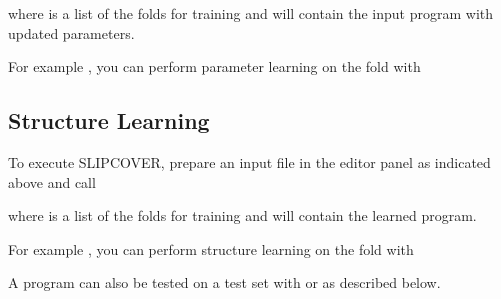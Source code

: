 \documentclass[letterpaper,10pt,english]{sphinxmanual}
\begin{document}
\sphinxAtStartPar
where  is a list of the folds for training and  will contain the input program with updated parameters.

\sphinxAtStartPar
For example , you can perform parameter learning on the  fold with

\begin{sphinxVerbatim}[commandchars=\\\{\}]
 \PYG{p}{[}\PYG{p}{]}
\end{sphinxVerbatim}


\subsection{Structure Learning}
\label{\detokenize{index:structure-learning}}
\sphinxAtStartPar
To execute SLIPCOVER, prepare an input file in the editor panel as indicated above and call

\begin{sphinxVerbatim}[commandchars=\\\{\}]
  
\end{sphinxVerbatim}

\sphinxAtStartPar
where  is a list of the folds for training and  will contain the learned program.

\sphinxAtStartPar
For example , you can perform structure learning on the  fold with

\begin{sphinxVerbatim}[commandchars=\\\{\}]
 \PYG{p}{[}\PYG{p}{]}
\end{sphinxVerbatim}

\sphinxAtStartPar
A program can also be tested on a test set with  or  as described below.
\end{document}
